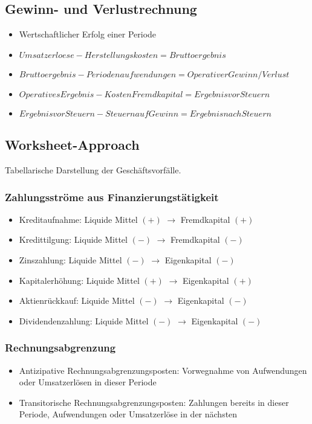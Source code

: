 \subsection{Gewinn- und Verlustrechnung}
\begin{itemize}
	\item Wertschaftlicher Erfolg einer Periode
	\item \(Umsatzerloese - Herstellungskosten = Bruttoergebnis\)
	\item \(Bruttoergebnis - Periodenaufwendungen = Operativer Gewinn/Verlust\)
	\item \(Operatives Ergebnis - Kosten Fremdkapital = Ergebnis vor Steuern\)
	\item \(Ergebnis vor Steuern - Steuern auf Gewinn = Ergebnis nach Steuern\)
\end{itemize}


\subsection{Worksheet-Approach}
Tabellarische Darstellung der Geschäftsvorfälle.

\subsubsection{Zahlungsströme aus Finanzierungstätigkeit}
\begin{itemize}
	\item Kreditaufnahme: Liquide Mittel \((+)\) \(\rightarrow\) Fremdkapital \((+)\)
	\item Kredittilgung: Liquide Mittel \((-)\) \(\rightarrow\) Fremdkapital \((-)\)
	\item Zinszahlung: Liquide Mittel \((-)\) \(\rightarrow\) Eigenkapital \((-)\)
	\item Kapitalerhöhung: Liquide Mittel \((+)\) \(\rightarrow\) Eigenkapital \((+)\)
	\item Aktienrückkauf: Liquide Mittel \((-)\) \(\rightarrow\) Eigenkapital \((-)\)
	\item Dividendenzahlung: Liquide Mittel \((-)\) \(\rightarrow\) Eigenkapital \((-)\)
\end{itemize}

\subsubsection{Rechnungsabgrenzung}
\begin{itemize}
	\item Antizipative Rechnungsabgrenzungsposten: Vorwegnahme von Aufwendungen oder Umsatzerlösen in dieser Periode
	\item Transitorische Rechnungsabgrenzungsposten: Zahlungen bereits in dieser Periode, Aufwendungen oder Umsatzerlöse in der nächsten
\end{itemize}

